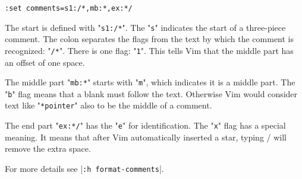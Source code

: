 \begin{Verbatim}[samepage=true]
 :set comments=s1:/*,mb:*,ex:*/
\end{Verbatim}

The start is defined with "\verb!s1:/*!".
The "\verb!s!" indicates the start of a three-piece comment.
The colon separates the flags from the text by which the comment is recognized: "\verb!/*!".
There is one flag: "\verb!1!".
This tells Vim that the middle part has an offset of one space.

The middle part "\verb!mb:*!" starts with "\verb!m!", which indicates it is a middle part.
The "\verb!b!" flag means that a blank must follow the text.
Otherwise Vim would consider text like "\verb!*pointer!" also to be the middle of a comment.

The end part "\verb!ex:*/!" has the "\verb!e!" for identification.
The "\verb!x!" flag has a special meaning.
It means that after Vim automatically inserted a star, typing / will remove the extra space.

For more details see |\verb!:h format-comments!|.
\clearpage
